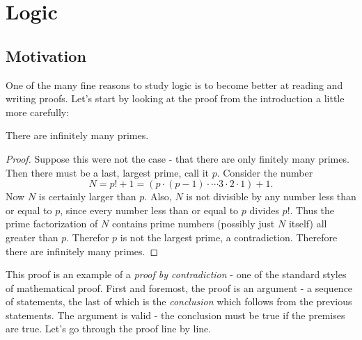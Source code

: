 

\section{Logic}

\subsection{Motivation}

One of the many fine reasons to study logic is to become better at reading and writing proofs.  Let's start by looking at the proof from the introduction a little more carefully:

\begin{theorem}
 There are infinitely many primes.
\end{theorem}

\begin{proof}
 Suppose this were not the case - that there are only finitely many primes.  Then there must be a last, largest prime, call it $p$. Consider the number 
 \[N = p! + 1 = (p \cdot (p-1) \cdot \cdots 3\cdot 2 \cdot 1) + 1.\]
 Now $N$ is certainly larger than $p$.  Also, $N$ is not divisible by any number less than or equal to $p$, since every number less than or equal to $p$ divides $p!$.  Thus the prime factorization of $N$ contains prime numbers (possibly just $N$ itself) all greater than $p$.  Therefor $p$ is not the largest prime, a contradiction.  Therefore there are infinitely many primes.
\end{proof}

This proof is an example of a {\em proof by contradiction} - one of the standard styles of mathematical proof.  First and foremost, the proof is an argument - a sequence of statements, the last of which is the {\em conclusion} which follows from the previous statements.  The argument is valid - the conclusion must be true if the premises are true.  Let's go through the proof line by line.


